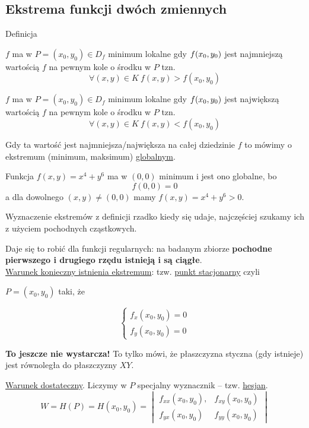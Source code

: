\subsection{Ekstrema funkcji dwóch zmiennych}

\begin{tw}{Definicja}

$f$ ma w $ P = (x_0, y_0) \in D_f $ minimum lokalne gdy $ f(x_0, y_0) $ jest najmniejszą wartością $f$ na pewnym kole o środku w $P$ tzn.
\[ \forall(x,y) \in K \ f(x,y) > f(x_0, y_0) \]

$f$ ma w $ P = (x_0, y_0) \in D_f $ minimum lokalne gdy $ f(x_0, y_0) $ jest największą wartością $f$ na pewnym kole o środku w $P$ tzn.
\[ \forall(x,y) \in K \ f(x,y) < f(x_0, y_0) \]

Gdy ta wartość jest najmniejsza/największa na całej dziedzinie $f$ to mówimy o ekstremum (minimum, maksimum) \underline{globalnym}.
\end{tw}

\begin{przyklad}
Funkcja $ f(x,y) = x^4 + y^6 $ ma w $(0,0)$ minimum i jest ono globalne, bo
$$ f(0,0) = 0 $$
a dla dowolnego $ (x,y) \neq (0,0) $ mamy $ f(x,y) = x^4 + y^6 > 0 $.
\end{przyklad}

Wyznaczenie ekstremów z definicji rzadko kiedy się udaje, najczęściej szukamy ich z użyciem pochodnych cząstkowych.

Daje się to robić dla funkcji regularnych: na badanym zbiorze \textbf{pochodne pierwszego i drugiego rzędu istnieją i są ciągłe}. \\

\underline{Warunek konieczny istnienia ekstremum}: tzw. \underline{punkt stacjonarny} czyli

$ P = (x_0, y_0) $ taki, że 

$$ \left\{ \begin{aligned} f_x(x_0, y_0) = 0 \\ f_y(x_0, y_0) = 0  \end{aligned} \right. $$

\textbf{To jeszcze nie wystarcza!} To tylko mówi, że płaszczyzna styczna (gdy istnieje) jest równoległa do płaszczyzny $XY$.

\underline{Warunek dostateczny}. Liczymy w $P$ specjalny wyznacznik -- tzw. \underline{hesjan}.
$$ W = H(P) = H(x_0, y_0) = \begin{vmatrix} f_{xx}(x_0, y_0), & f_{xy}(x_0, y_0) \\ f_{yx}(x_0, y_0) & f_{yy}(x_0, y_0) \end{vmatrix} $$

